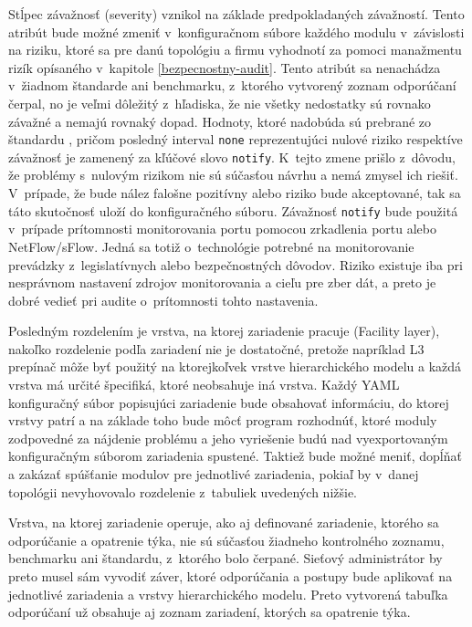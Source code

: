 Stĺpec závažnosť (severity) vznikol na základe predpokladaných závažností. Tento atribút bude možné zmeniť v~konfiguračnom súbore každého modulu v~závislosti na riziku, ktoré sa pre danú topológiu a firmu vyhodnotí za pomoci manažmentu rizík opísaného v~kapitole \ref{bezpecnostny-audit}. Tento atribút sa nenachádza v~žiadnom štandarde ani benchmarku, z~ktorého vytvorený zoznam odporúčaní čerpal, no je veľmi dôležitý z~hľadiska, že nie všetky nedostatky sú rovnako závažné a nemajú rovnaký dopad. Hodnoty, ktoré nadobúda sú prebrané zo štandardu , pričom posledný interval \texttt{none} reprezentujúci nulové riziko respektíve závažnosť je zamenený za kľúčové slovo \texttt{notify}. K~tejto zmene prišlo z~dôvodu, že problémy s~nulovým rizikom nie sú súčasťou návrhu a nemá zmysel ich riešiť. V~prípade, že bude nález falošne pozitívny alebo riziko bude akceptované, tak sa táto skutočnosť uloží do konfiguračného súboru. Závažnosť \texttt{notify} bude použitá v~prípade prítomnosti monitorovania portu pomocou zrkadlenia portu alebo NetFlow/sFlow. Jedná sa totiž o~technológie potrebné na monitorovanie prevádzky z~legislatívnych alebo bezpečnostných dôvodov. Riziko existuje iba pri nesprávnom nastavení zdrojov monitorovania a cieľu pre zber dát, a preto je dobré vedieť pri audite o~prítomnosti tohto nastavenia.
 

Posledným rozdelením je vrstva, na ktorej zariadenie pracuje (Facility layer), nakoľko rozdelenie podľa zariadení nie je dostatočné, pretože napríklad L3 prepínač môže byť použitý na ktorejkoľvek vrstve hierarchického modelu a každá vrstva má určité špecifiká, ktoré neobsahuje iná vrstva. Každý YAML konfiguračný súbor popisujúci zariadenie bude obsahovať informáciu, do ktorej vrstvy patrí a na základe toho bude môcť program rozhodnúť, ktoré moduly zodpovedné za nájdenie problému a jeho vyriešenie budú nad vyexportovaným konfiguračným súborom zariadenia spustené. Taktiež bude možné meniť, dopĺňať a zakázať spúšťanie modulov pre jednotlivé zariadenia, pokiaľ by v~danej topológii nevyhovovalo rozdelenie z~tabuliek uvedených nižšie. 

Vrstva, na ktorej zariadenie operuje, ako aj definované zariadenie, ktorého sa odporúčanie a opatrenie týka, nie sú súčasťou žiadneho kontrolného zoznamu, benchmarku ani štandardu, z~ktorého bolo čerpané. Sieťový administrátor by preto musel sám vyvodiť záver, ktoré odporúčania a postupy bude aplikovať na jednotlivé zariadenia a vrstvy hierarchického modelu. Preto vytvorená tabuľka odporúčaní už obsahuje aj zoznam zariadení, ktorých sa opatrenie týka.


